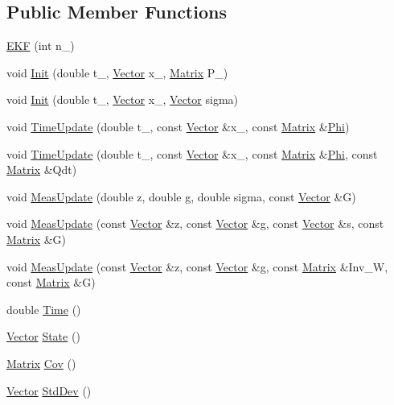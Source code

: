 \subsection*{Public Member Functions}
\begin{DoxyCompactItemize}
\item 
\hyperlink{classEKF_ac3ea8221d535e025dfd9e330d1bc3e72}{E\-K\-F} (int n\-\_\-)
\item 
void \hyperlink{classEKF_acf949c77d116256b94cb4f56b874de4e}{Init} (double t\-\_\-, \hyperlink{classVector}{Vector} x\-\_\-, \hyperlink{classMatrix}{Matrix} P\-\_\-)
\item 
void \hyperlink{classEKF_aca56e0778d22bf7899716cdac757b909}{Init} (double t\-\_\-, \hyperlink{classVector}{Vector} x\-\_\-, \hyperlink{classVector}{Vector} sigma)
\item 
void \hyperlink{classEKF_a581eb4063feb02eeff09dabeaf07e994}{Time\-Update} (double t\-\_\-, const \hyperlink{classVector}{Vector} \&x\-\_\-, const \hyperlink{classMatrix}{Matrix} \&\hyperlink{GEODA_8cpp_ad363d83dfb0be87465bd76a2e5e0ff6b}{Phi})
\item 
void \hyperlink{classEKF_ac9e0e9b6f423ad75fc71eae01d785930}{Time\-Update} (double t\-\_\-, const \hyperlink{classVector}{Vector} \&x\-\_\-, const \hyperlink{classMatrix}{Matrix} \&\hyperlink{GEODA_8cpp_ad363d83dfb0be87465bd76a2e5e0ff6b}{Phi}, const \hyperlink{classMatrix}{Matrix} \&Qdt)
\item 
void \hyperlink{classEKF_a2384ab018c26960ee808a9a1ae66d319}{Meas\-Update} (double z, double g, double sigma, const \hyperlink{classVector}{Vector} \&G)
\item 
void \hyperlink{classEKF_a080c81bbef29da2b57caa52775f76602}{Meas\-Update} (const \hyperlink{classVector}{Vector} \&z, const \hyperlink{classVector}{Vector} \&g, const \hyperlink{classVector}{Vector} \&s, const \hyperlink{classMatrix}{Matrix} \&G)
\item 
void \hyperlink{classEKF_afe7d00a0c74d8c0bfa98574233445a0a}{Meas\-Update} (const \hyperlink{classVector}{Vector} \&z, const \hyperlink{classVector}{Vector} \&g, const \hyperlink{classMatrix}{Matrix} \&Inv\-\_\-\-W, const \hyperlink{classMatrix}{Matrix} \&G)
\item 
double \hyperlink{classEKF_aca97d9e3ba20ff1ac5dbf1c4a913c989}{Time} ()
\item 
\hyperlink{classVector}{Vector} \hyperlink{classEKF_accc2ee72c5f8727727fafffe6cf0c10a}{State} ()
\item 
\hyperlink{classMatrix}{Matrix} \hyperlink{classEKF_a796ecb81da82ddbaa790cea3dde7435f}{Cov} ()
\item 
\hyperlink{classVector}{Vector} \hyperlink{classEKF_ada67f575947bfc34de84584724b1a16e}{Std\-Dev} ()
\end{DoxyCompactItemize}

